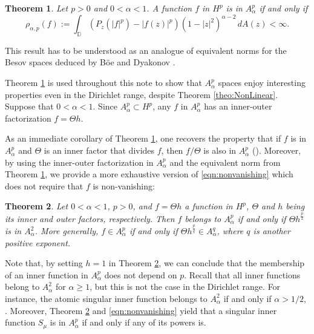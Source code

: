 \documentclass[12pt]{amsart}
\newtheorem{theorem}{Theorem}[section]
\theoremstyle{definition}
\newcommand{\D}{\mathbb{{D}}}
\numberwithin{equation}{section}
\begin{document}
        \begin{theorem}
            \label{theo:equiv_A}
            Let $p>0$ and $0<\alpha<1$. A function $f$ in $H^p$ is in $A^p_\alpha$ if and only if 
                \[
                    \rho_{\alpha,p} (f) := \int_{\D}\left(P_z(|f|^p)-|f(z)|^p\right)(1-|z|^2)^{\alpha-2}\,dA(z)<\infty.
                \]
        \end{theorem}

        This result has to be understood as an analogue of equivalent norms for the Besov spaces deduced by Böe \cite{Boe03} and Dyakonov \cite{Dyakonov98}.
            
        Theorem \ref{theo:equiv_A} is used throughout this note to show that $A^p_\alpha$ spaces enjoy interesting properties even in the Dirichlet range, despite Theorem \ref{theo:NonLinear}. Suppose that $0<\alpha<1$. Since $A^p_\alpha\subset H^p$, any $f$ in $A^p_\alpha$ has an inner-outer factorization $f=\Theta h$.
        
        As an immediate corollary of Theorem \ref{theo:equiv_A}, one recovers the property that if $f$ is in $A^p_\alpha$ and $\Theta$ is an inner factor that divides $f$, then $f/\Theta$ is also in $A^p_\alpha$ (\cite[Theorem 1.8]{brevig2025contractivehardylittlewoodinequalitiesdirichlet}). Moreover, by using the inner-outer factorization in $A^p_\alpha$ and the equivalent norm from Theorem \ref{theo:equiv_A}, we provide a more exhaustive version of \eqref{eqn:nonvanishing} which does not require that $f$ is non-vanishing:
        
        \begin{theorem}
        \label{theo:p/2}
            Let $0<\alpha<1$, $p>0$, and $f=\Theta h$ a function in $H^p$, $\Theta$ and $h$ being its inner and outer factors, respectively. Then $f$ belongs to $A^p_\alpha$ if and only if $\Theta h^\frac{p}{2}$ is in $A^2_\alpha$. More generally, $f \in A^p_\alpha$ if and only if $\Theta h^{\frac{p}{q}} \in A^q_\alpha$, where $q$ is another positive exponent.
        \end{theorem}
        
        Note that, by setting $h=1$ in Theorem \ref{theo:p/2}, we can conclude that the membership of an inner function in $A^p_\alpha$ does not depend on $p$. Recall that all inner functions belong to $A^2_\alpha$ for $\alpha\ge1$, but this is not the case in the Dirichlet range. For instance, the atomic singular inner function belongs to $A^2_\alpha$ if and only if $\alpha> 1/2$, \cite{NS62}. Moreover, Theorem \ref{theo:p/2} and \eqref{eqn:nonvanishing} yield that a singular inner function $S_\mu$ is in $A^p_\alpha$ if and only if any of its powers is.
\end{document}
